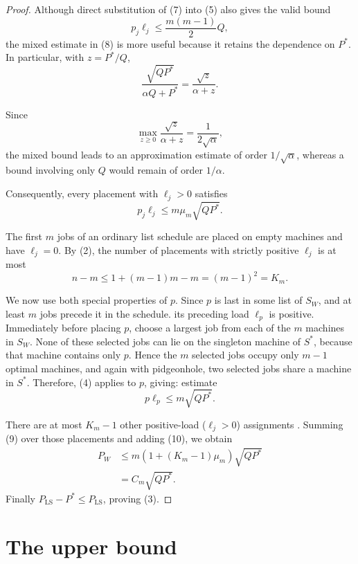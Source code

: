 \documentclass[11pt]{article}
\begin{document}
\begin{proof}
Although direct substitution of (7) into (5) also gives the valid bound
\[
p_j\ell_j\le \frac{m(m-1)}{2}Q,
\]
the mixed estimate in (8) is more useful because it retains the dependence
on \(P^*\). In particular, with \(z=P^*/Q\),
\[
\frac{\sqrt{QP^*}}{\alpha Q+P^*}
=
\frac{\sqrt z}{\alpha+z}.
\]

Since
\[
\max_{z\ge0}\frac{\sqrt z}{\alpha+z}
=
\frac{1}{2\sqrt{\alpha}},
\]
the mixed bound leads to an approximation estimate of order
\(1/\sqrt{\alpha}\), whereas a bound involving only \(Q\) would remain of
order \(1/\alpha\).

Consequently, every placement with \(\ell_j>0\) satisfies
\[
 p_j\ell_j\le m\mu_m\sqrt{QP^*}.
\tag{9}
\]

The first \(m\) jobs of an ordinary list schedule are placed on empty
machines and have \(\ell_j=0\).  By (2), the number of placements with strictly
positive $\ell_j$ is at most
\[
 n-m\le 1+(m-1)m - m = (m-1)^2=K_m.
\]

We now use both special properties of \(p\). Since \(p\) is last in some list of $S_{W}$,
and at least $m$ jobs precede it in the schedule. its preceding load \(\ell_p\) is positive.  Immediately before placing \(p\),
choose a largest job from each of the \(m\) machines in $S_W$.  None of these
selected jobs can lie on the singleton machine of $S^*$, because that
machine contains only \(p\).  Hence the \(m\) selected jobs occupy only
\(m-1\) optimal machines, and again with pidgeonhole, two selected jobs share a machine in $S^*$.
Therefore, (4) applies to \(p\), giving: 
estimate
\[
 p\ell_p\le m\sqrt{QP^*}.
\tag{10}
\]

There are at most \(K_m-1\) other positive-load ($\ell_j > 0$) assignments .  Summing (9)
over those placements and adding (10), we obtain
\[
\begin{aligned}
 P_{W}
 &\le
 m\left(1+(K_m-1)\mu_m\right)\sqrt{QP^*}\\
 &=C_m\sqrt{QP^*}.
\end{aligned}
\]
Finally \(P_{\mathrm{LS}}-P^*\le P_{\mathrm{LS}}\), proving (3).
\end{proof}

\section{The upper bound}
\end{document}
